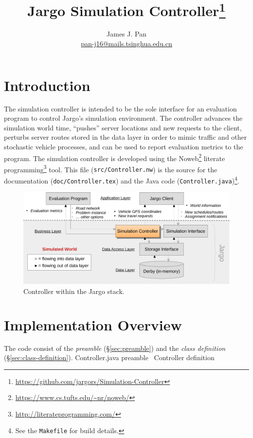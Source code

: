 \documentclass{article}
\title{Jargo Simulation Controller\footnote{
  \url{https://github.com/jargors/Simulation-Controller}}}
\author{James J. Pan\\
  \small{\href{mailto:pan-j16@mails.tsinghua.edu.cn}{pan-j16@mails.tsinghua.edu.cn}}}
\def\nwendcode{\endtrivlist \endgroup}      %
\let\nwdocspar=\par
\begin{document}
\maketitle
\pagestyle{noweb}

\tableofcontents

\section{Introduction}
\label{sec:introduction}
The simulation controller is intended to be the sole interface for an
evaluation program to control Jargo's simulation environment. The controller
advances the simulation world time, ``pushes'' server locations and new
requests to the client, perturbs server routes stored in the data layer in
order to mimic traffic and other stochastic vehicle processes, and can be used
to report evaluation metrics to the program.  The simulation controller is
developed using the Noweb\footnote{\url{https://www.cs.tufts.edu/~nr/noweb/}}
literate programming\footnote{\url{http://literateprogramming.com/}} tool.
This file ({\tt{}src/Controller.nw}) is the source for the documentation
({\tt{}doc/Controller.tex}) and the Java code ({\tt{}Controller.java})\footnote{See
the {\tt{}Makefile} for build details.}.

\begin{figure}[h]
\centering
\includegraphics[width=150mm]{src/fig/controller-fig}
\caption{Controller within the Jargo stack.}
\label{fig:controller}
\end{figure}

\section{Implementation Overview}
The code consist of the \emph{preamble} (\S\ref{sec:preamble})
and the \emph{class definition} (\S\ref{sec:class-definition}).
\endmoddef{}
  \LA{}Controller.java preamble~{\nwtagstyle{}}\RA{}
  \LA{}\code{}Controller\edoc{} definition~{\nwtagstyle{}}\RA{}
\nwendcode{}\nwdocspar
\end{document}
